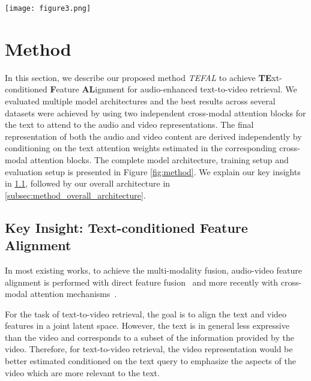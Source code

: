 \documentclass[10pt,twocolumn,letterpaper]{article}
\begin{document}
\begin{figure*}
  \centering
    \texttt{[image: figure3.png]}
    \caption{The model architecture of our method \textit{TEFAL} is presented in the left of the figure. The highlighted tokens from the encoders are the  CLS tokens for video frames, one CLS token for the text caption and  patch embeddings from the audio encoder. Query, Key and Value projections are created from these tokens and are used in the cross-attention blocks. These cross-attention blocks give us a text-conditioned video embedding and audio embeddings, which are fused through summation and used during training and evaluation, as presented on the right of the figure.}
  \label{fig:method} 
\end{figure*}


\section{Method}
In this section, we describe our proposed method \textit{TEFAL} to achieve \textbf{TE}xt-conditioned \textbf{F}eature \textbf{AL}ignment for audio-enhanced text-to-video retrieval. We evaluated multiple model architectures and the best results across several datasets were achieved by using two independent cross-modal attention blocks for the text to attend to the audio and video representations. The final representation of both the audio and video content are derived independently by conditioning on the text attention weights estimated in the corresponding cross-modal attention blocks. The complete model architecture, training setup and evaluation setup is presented in Figure \ref{fig:method}. We explain our key insights in \ref{subsec:method_key_insight_Text_feature_alignment}, followed by our overall architecture in \ref{subsec:method_overall_architecture}.

\subsection{Key Insight: Text-conditioned Feature Alignment}
\label{subsec:method_key_insight_Text_feature_alignment}
In most existing works, to achieve the multi-modality fusion, audio-video feature alignment is performed with direct feature fusion~\cite{wang2020alignnet} and more recently with cross-modal attention mechanisms~\cite{ECLIPSE_ECCV22}.

For the task of text-to-video retrieval, the goal is to align the text and video features in a joint latent space. However, the text is in general less expressive than the video and corresponds to a subset of the information provided by the video. Therefore, for text-to-video retrieval, the video representation would be better estimated conditioned on the text query to emphasize the aspects of the video which are more relevant to the text.
\end{document}
